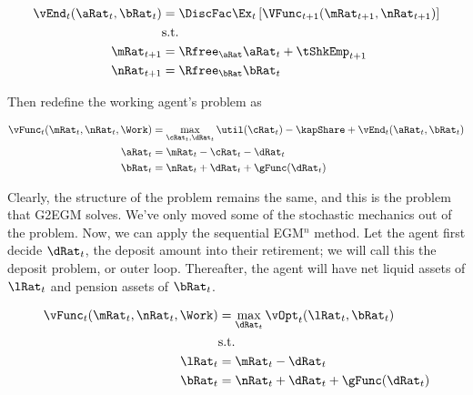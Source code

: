 \documentclass[\econtexRoot/SequentialEGM]{subfiles}
\begin{document}
\begin{equation}
        \begin{split}
                \vEnd_{t}(\aRat_{t}, \bRat_{t}) & =  \DiscFac
                \Ex_{t} \left[ \VFunc_{t+1}(\mRat_{t+1}, \nRat_{t+1}) \right] \\
                & \text{s.t.} \\
                \mRat_{t+1} & = \Rfree_{\aRat} \aRat_{t} + \tShkEmp_{t+1} \\
                \nRat_{t+1} & = \Rfree_{\bRat} \bRat_{t}
        \end{split}
\end{equation}

Then redefine the working agent's problem as

\begin{equation}
        \begin{split}
                \vFunc_{t}(\mRat_{t}, \nRat_{t}, \Work) & = \max_{\cRat_{t},
                        \dRat_{t}} \util(\cRat_{t})  - \kapShare + \vEnd_{t}(\aRat_{t},
                \bRat_{t}) \\
                \aRat_{t} & = \mRat_{t} - \cRat_{t} - \dRat_{t} \\
                \bRat_{t} & = \nRat_{t} + \dRat_{t} + \gFunc(\dRat_{t}) \\
        \end{split}
\end{equation}

Clearly, the structure of the problem remains the same, and this is the problem
that G2EGM solves. We've only moved some
of the stochastic mechanics out of the problem. Now, we can apply the
sequential EGM$^n$ method. Let the agent first decide $\dRat_{t}$, the deposit
amount into their retirement; we will call this the deposit problem, or outer loop. Thereafter, the
agent will have net liquid assets
of $\lRat_{t}$ and pension assets of $\bRat_{t}$.

\begin{equation}
        \begin{split}
                \vFunc_{t}(\mRat_{t}, \nRat_{t}, \Work) & = \max_{\dRat_{t}}
                \vOpt_{t}(\lRat_{t}, \bRat_{t}) \\
                & \text{s.t.} \\
                \lRat_{t} & = \mRat_{t} - \dRat_{t} \\
                \bRat_{t} & = \nRat_{t} + \dRat_{t} + \gFunc(\dRat_{t})
        \end{split}
\end{equation}
\end{document}
